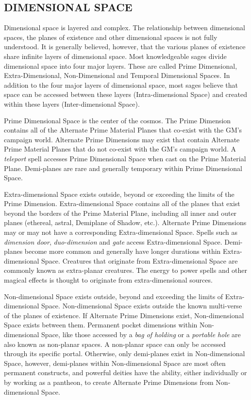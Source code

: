 \begin{multicols}{2}
\section{DIMENSIONAL SPACE}

Dimensional space is layered and complex.  The relationship between dimensional spaces, the planes of existence and other dimensional spaces is not fully understood.  It is generally believed, however, that the various planes of existence share infinite layers of dimensional space.  Most knowledgeable sages divide dimensional space into four major layers.  These are called Prime Dimensional, Extra-Dimensional, Non-Dimensional and Temporal Dimensional Spaces.  In addition to the four major layers of dimensional space, most sages believe that space can be accessed between these layers (Intra-dimensional Space) and created within these layers (Inter-dimensional Space).

Prime Dimensional Space is the center of the cosmos.  The Prime Dimension contains all of the Alternate Prime Material Planes that co-exist with the GM's campaign world.  Alternate Prime Dimensions may exist that contain Alternate Prime Material Planes that do not co-exist with the GM's campaign world.  A \textit{teleport} spell accesses Prime Dimensional Space when cast on the Prime Material Plane.  Demi-planes are rare and generally temporary within Prime Dimensional Space.

Extra-dimensional Space exists outside, beyond or exceeding the limits of the Prime Dimension.  Extra-dimensional Space contains all of the planes that exist beyond the borders of the Prime Material Plane, including all inner and outer planes (ethereal, astral, Demiplane of Shadow, etc.).  Alternate Prime Dimensions may or may not have a corresponding Extra-dimensional Space.  Spells such as \textit{dimension door}, \textit{duo-dimension} and \textit{gate} access Extra-dimensional Space.  Demi-planes become more common and generally have longer durations within Extra-dimensional Space.  Creatures that originate from Extra-dimensional Space are commonly known as extra-planar creatures.  The energy to power spells and other magical effects is thought to originate from extra-dimensional sources.

Non-dimensional Space exists outside, beyond and exceeding the limits of Extra-dimensional Space.  Non-dimensional Space exists outside the known multi-verse of the planes of existence.  If Alternate Prime Dimensions exist, Non-dimensional Space exists between them.  Permanent pocket dimensions within Non-dimensional Space, like those accessed by a \textit{bag of holding} or a \textit{portable hole} are also known as non-planar spaces.  A non-planar space can only be accessed through its specific portal.  Otherwise, only demi-planes exist in Non-dimensional Space, however, demi-planes within Non-dimensional Space are most often permanent constructs, and powerful deities have the ability, either individually or by working as a pantheon, to create Alternate Prime Dimensions from Non-dimensional Space. 


\end{multicols}

